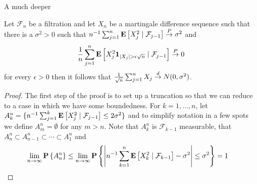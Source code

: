 A much deeper 

\begin{thm}Let $\mathcal{F}_n$ be a
  filtration and let $X_n$ be a martingale
  difference sequence such that there is a $\sigma^2 > 0$ such that $n^{-1} \sum_{j=1}^n
  \cexpectationlong{\mathcal{F}_{j-1}}{X^2_j} \toprob \sigma^2$ and 
\begin{align*}
\frac{1}{n} \sum_{j=1}^n  \cexpectationlong{\mathcal{F}_{j-1}}{X^2_j
  \characteristic{\abs{X_j} > \epsilon \sqrt{n}}} \toprob 0
\end{align*}
for every $\epsilon > 0$ then it follows that $\frac{1}{\sqrt{n}}
\sum_{j=1}^n X_j \todist N(0,\sigma^2)$.
\end{thm}
\begin{proof}
The first step of the proof is to set up a truncation so that we can
reduce to a case in which we have some boundedness.
For $k=1, \dotsc, n$, let $A^n_k = \lbrace n^{-1} \sum_{j=1}^k
  \cexpectationlong{\mathcal{F}_{j-1}}{X^2_j} \leq 2 \sigma^2 \rbrace$
  and to simplify notation in a few spots we define $A^n_m = \emptyset$ for any $m > n$.
Note that $A^n_k$ is $\mathcal{F}_{k-1}$ measurable, that 
  $A^n_n \subset A^n_{n-1} \subset \dotsb \subset A^n_1$ and 
\begin{align*}
\lim_{n \to \infty} \probability{A^n_n} &\leq \lim_{n \to \infty} \probability{\abs{n^{-1} \sum_{k=1}^n
  \cexpectationlong{\mathcal{F}_{k-1}}{X^2_k} - \sigma^2} \leq \sigma^2}
                                          = 1
\end{align*}


\end{proof}
